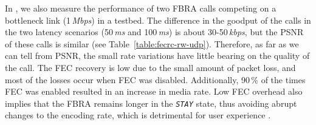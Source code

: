 In , we also measure the performance of two FBRA calls
competing on a bottleneck link (1\,\emph{Mbps}) in a testbed. The difference in the
goodput of the calls in the two latency scenarios (50\,\emph{ms} and
100\,\emph{ms}) is about 30-50\,\emph{kbps}, but the PSNR of these calls is
similar (see Table~\ref{table:fecrc-rw-udp}). Therefore, as far as we can tell from
PSNR, the small rate variations have little bearing on the quality of the
call. The FEC recovery is low due to the small amount of packet loss, and most of
the losses occur when FEC was disabled. Additionally, 90\,\% of the times FEC
was enabled resulted in an increase in media rate. Low FEC overhead also
implies that the FBRA remains longer in the \texttt{\emph{STAY}} state, thus
avoiding abrupt changes to the encoding rate, which is detrimental for user
experience \cite{Zink03subjectiveimpression}.

\begin{table}
  \caption{An RTP flow sharing a bottleneck link with short TCP flows in an
  emulated testbed. Results are average of 10 runs.}
  \label{table:fecrc-rw-tcp}
\end{table}


